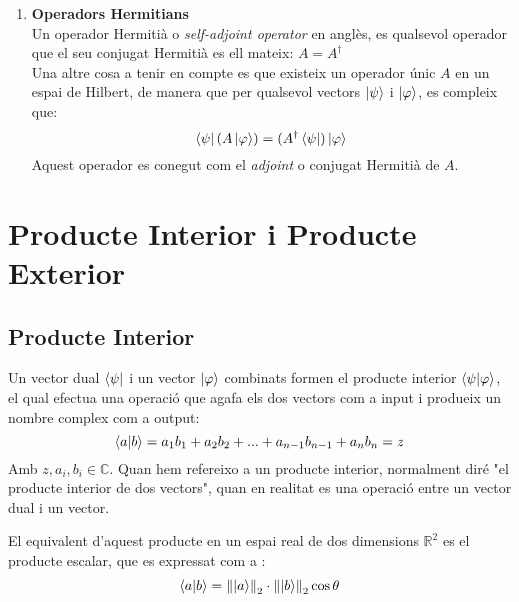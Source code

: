 \begin{enumerate}
	\item \textbf{Operadors Hermitians} \\
	Un operador Hermitià o \textit{self-adjoint operator} en anglès, es qualsevol operador que el seu conjugat Hermitià es ell mateix: $A = A^\dagger$ \\
	Una altre cosa a tenir en compte es que existeix un operador únic $A$ en un espai de Hilbert, de manera que per qualsevol vectors $\ket{\psi}$ i $\ket{\varphi}$, es compleix que:
	$$
	\bra{\psi} (A \ket{\varphi}) = (A^\dagger\bra{\psi})\ket{\varphi}
	$$ 
	Aquest operador es conegut com el \textit{adjoint} o conjugat Hermitià de $A$.
	
\end{enumerate}

\section{Producte Interior i Producte Exterior}

\subsection{Producte Interior}
Un vector dual $\bra{\psi}$ i un vector $\ket{\varphi}$ combinats formen el producte interior $\bra{\psi}\ket{\varphi}$, el qual efectua una operació que agafa els dos vectors com a input i produeix un nombre complex com a output:
$$
\bra{a}\ket{b} = a_1 b_1 + a_2 b_2 + ... + a_{n-1} b_{n-1} + a_n b_n = z
$$
Amb $z, a_i, b_i \in \mathbb{C}$. Quan hem refereixo a un producte interior, normalment diré "el producte interior de dos vectors", quan en realitat es una operació entre un vector dual i un vector.

El equivalent d'aquest producte en un espai real de dos dimensions $\mathbb{R}^2$ es el producte escalar, que es expressat com a :
\begin{equation}
	\bra{a}\ket{b} = \norm{\ket{a}}_2 \cdot \norm{\ket{b}}_2 \cos \theta 
	\label{eq:dot_product}
\end{equation}


